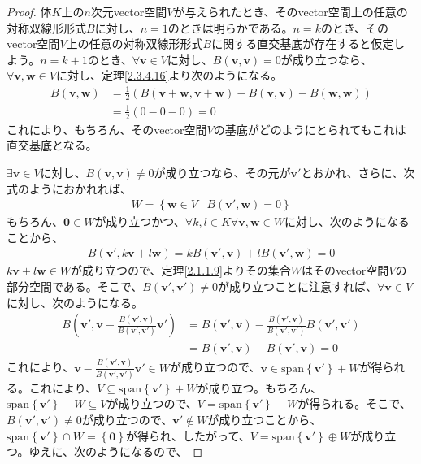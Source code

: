 \documentclass[dvipdfmx]{jsarticle}
\begin{document}
\begin{proof}
体$K$上の$n$次元vector空間$V$が与えられたとき、そのvector空間上の任意の対称双線形形式$B$に対し、$n = 1$のときは明らかである。$n = k$のとき、そのvector空間$V$上の任意の対称双線形形式$B$に関する直交基底が存在すると仮定しよう。$n = k + 1$のとき、$\forall\mathbf{v} \in V$に対し、$B\left( \mathbf{v},\mathbf{v} \right) = 0$が成り立つなら、$\forall\mathbf{v},\mathbf{w} \in V$に対し、定理\ref{2.3.4.16}より次のようになる。
\begin{align*}
B\left( \mathbf{v},\mathbf{w} \right) &= \frac{1}{2}\left( B\left( \mathbf{v} + \mathbf{w},\mathbf{v} + \mathbf{w} \right) - B\left( \mathbf{v},\mathbf{v} \right) - B\left( \mathbf{w},\mathbf{w} \right) \right)\\
&= \frac{1}{2}(0 - 0 - 0) = 0
\end{align*}
これにより、もちろん、そのvector空間$V$の基底がどのようにとられてもこれは直交基底となる。\par
$\exists\mathbf{v} \in V$に対し、$B\left( \mathbf{v},\mathbf{v} \right) \neq 0$が成り立つなら、その元が$\mathbf{v}'$とおかれ、さらに、次式のようにおかれれば、
\begin{align*}
W = \left\{ \mathbf{w} \in V \middle| B\left( \mathbf{v}',\mathbf{w} \right) = 0 \right\}
\end{align*}
もちろん、$\mathbf{0} \in W$が成り立つかつ、$\forall k,l \in K\forall\mathbf{v},\mathbf{w} \in W$に対し、次のようになることから、
\begin{align*}
B\left( \mathbf{v}',k\mathbf{v} + l\mathbf{w} \right) = kB\left( \mathbf{v}',\mathbf{v} \right) + lB\left( \mathbf{v}',\mathbf{w} \right) = 0
\end{align*}
$k\mathbf{v} + l\mathbf{w} \in W$が成り立つので、定理\ref{2.1.1.9}よりその集合$W$はそのvector空間$V$の部分空間である。そこで、$B\left( \mathbf{v}',\mathbf{v}' \right) \neq 0$が成り立つことに注意すれば、$\forall\mathbf{v} \in V$に対し、次のようになる。
\begin{align*}
B\left( \mathbf{v}',\mathbf{v} - \frac{B\left( \mathbf{v}',\mathbf{v} \right)}{B\left( \mathbf{v}',\mathbf{v}' \right)}\mathbf{v}' \right) &= B\left( \mathbf{v}',\mathbf{v} \right) - \frac{B\left( \mathbf{v}',\mathbf{v} \right)}{B\left( \mathbf{v}',\mathbf{v}' \right)}B\left( \mathbf{v}',\mathbf{v}' \right)\\
&= B\left( \mathbf{v}',\mathbf{v} \right) - B\left( \mathbf{v}',\mathbf{v} \right) = 0
\end{align*}
これにより、$\mathbf{v} - \frac{B\left( \mathbf{v}',\mathbf{v} \right)}{B\left( \mathbf{v}',\mathbf{v}' \right)}\mathbf{v}' \in W$が成り立つので、$\mathbf{v} \in {\mathrm{span}}\left\{ \mathbf{v}' \right\} + W$が得られる。これにより、$V \subseteq {\mathrm{span}}\left\{ \mathbf{v}' \right\} + W$が成り立つ。もちろん、${\mathrm{span}}\left\{ \mathbf{v}' \right\} + W \subseteq V$が成り立つので、$V = {\mathrm{span}}\left\{ \mathbf{v}' \right\} + W$が得られる。そこで、$B\left( \mathbf{v}',\mathbf{v}' \right) \neq 0$が成り立つので、$\mathbf{v}' \notin W$が成り立つことから、${\mathrm{span}}\left\{ \mathbf{v}' \right\} \cap W = \left\{ \mathbf{0} \right\}$が得られ、したがって、$V = {\mathrm{span}}\left\{ \mathbf{v}' \right\} \oplus W$が成り立つ。ゆえに、次のようになるので、

\end{proof}
\end{document}
